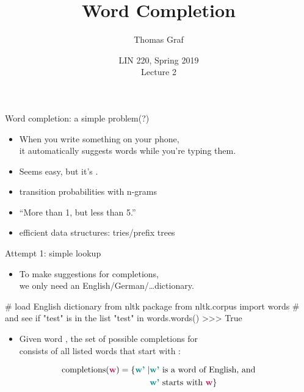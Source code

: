 \documentclass[professionalfonts, xcolor={usenames,svgnames,x11names,table}]{beamer}
\title{Word Completion}
\author{Thomas Graf}
\institute{Stony Brook University\\\texttt{lin120@thomasgraf.net}}
\date{LIN 220, Spring 2019\\Lecture 2}
\begin{document}
\unnumbered{
\begin{frame}
	\titlepage
\end{frame}
}

\begin{frame}{Word completion: a simple problem(?)}
    \begin{itemize}
        \item When you write something on your phone,\\
              it automatically suggests words while you're typing them.
        \item Seems easy, but it's .
    \end{itemize}

    \begin{lessons}
        \begin{itemize}
            \item transition probabilities with n-grams
            \item ``More than 1, but less than 5.''
            \item efficient data structures: tries\slash prefix trees
        \end{itemize}
    \end{lessons}
\end{frame}

\begin{frame}[fragile]{Attempt 1: simple lookup}
    \begin{itemize}
        \item To make suggestions for completions,\\
              we only need an English\slash German\slash\ldots dictionary.
    \end{itemize}

    \begin{pythoncode}
        # load English dictionary from nltk package
        from nltk.corpus import words
        # and see if "test" is in the list
        "test" in words.words()
        >>> True
    \end{pythoncode}

    \begin{itemize}
        \item Given word , the set of possible completions for \\
              consists of all listed words that start with :
    \end{itemize}

    \begin{align*}
        \text{completions}(\textbf{\color{purple}w}) = \{ \textbf{\color{teal}w'} \mid &
              \textbf{\color{teal}w'} \text{ is a word of English, and}\\
            & \textbf{\color{teal}w'} \text{ starts with } \textbf{\color{purple}w} \}
    \end{align*}
\end{frame}
\end{document}
